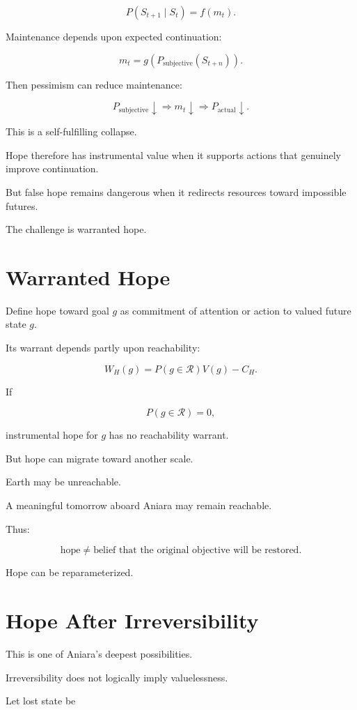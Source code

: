 \documentclass[11pt,oneside]{book}
\theoremstyle{definition}
\theoremstyle{remark}
\newcommand{\R}{\mathcal{R}}
\begin{document}
\[
P(S_{t+1}\mid S_t)
=
f(m_t).
\]

Maintenance depends upon expected continuation:

\[
m_t
=
g(P_{\mathrm{subjective}}(S_{t+n})).
\]

Then pessimism can reduce maintenance:

\[
P_{\mathrm{subjective}}\downarrow
\Rightarrow
m_t\downarrow
\Rightarrow
P_{\mathrm{actual}}\downarrow.
\]

This is a self-fulfilling collapse.

Hope therefore has instrumental value when it supports actions that genuinely improve continuation.

But false hope remains dangerous when it redirects resources toward impossible futures.

The challenge is warranted hope.

\section{Warranted Hope}

Define hope toward goal \(g\) as commitment of attention or action to valued future state \(g\).

Its warrant depends partly upon reachability:

\[
W_H(g)
=
P(g\in\R)V(g)-C_H.
\]

If

\[
P(g\in\R)=0,
\]

instrumental hope for \(g\) has no reachability warrant.

But hope can migrate toward another scale.

Earth may be unreachable.

A meaningful tomorrow aboard Aniara may remain reachable.

Thus:

\[
\text{hope}
\neq
\text{belief that the original objective will be restored}.
\]

Hope can be reparameterized.

\section{Hope After Irreversibility}

This is one of Aniara's deepest possibilities.

Irreversibility does not logically imply valuelessness.

Let lost state be
\end{document}
